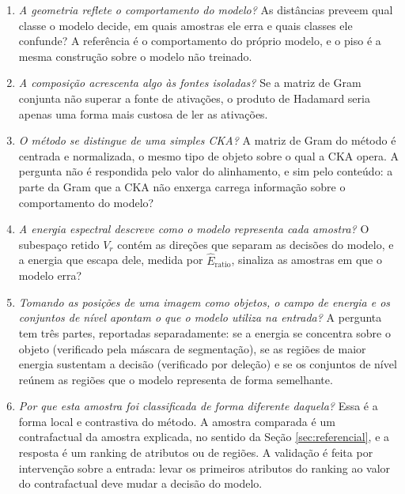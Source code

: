 \begin{enumerate}
    \item[\textbf{P1.}] \textit{A geometria reflete o comportamento do modelo?} As distâncias preveem qual classe o modelo decide, em quais amostras ele erra e quais classes ele confunde? A referência é o comportamento do próprio modelo, e o piso é a mesma construção sobre o modelo não treinado.

    \item[\textbf{P2.}] \textit{A composição acrescenta algo às fontes isoladas?} Se a matriz de Gram conjunta não superar a fonte de ativações, o produto de Hadamard seria apenas uma forma mais custosa de ler as ativações.

    \item[\textbf{P3.}] \textit{O método se distingue de uma simples CKA?} A matriz de Gram do método é centrada e normalizada, o mesmo tipo de objeto sobre o qual a CKA opera. A pergunta não é respondida pelo valor do alinhamento, e sim pelo conteúdo: a parte da Gram que a CKA não enxerga carrega informação sobre o comportamento do modelo?

    \item[\textbf{P4.}] \textit{A energia espectral descreve como o modelo representa cada amostra?} O subespaço retido $V_r$ contém as direções que separam as decisões do modelo, e a energia que escapa dele, medida por $\widehat{E}_{\mathrm{ratio}}$, sinaliza as amostras em que o modelo erra?

    \item[\textbf{P5.}] \textit{Tomando as posições de uma imagem como objetos, o campo de energia e os conjuntos de nível apontam o que o modelo utiliza na entrada?} A pergunta tem três partes, reportadas separadamente: se a energia se concentra sobre o objeto (verificado pela máscara de segmentação), se as regiões de maior energia sustentam a decisão (verificado por deleção) e se os conjuntos de nível reúnem as regiões que o modelo representa de forma semelhante.

    \item[\textbf{P6.}] \textit{Por que esta amostra foi classificada de forma diferente daquela?} Essa é a forma local e contrastiva do método. A amostra comparada é um contrafactual da amostra explicada, no sentido da Seção \ref{sec:referencial}, e a resposta é um ranking de atributos ou de regiões. A validação é feita por intervenção sobre a entrada: levar os primeiros atributos do ranking ao valor do contrafactual deve mudar a decisão do modelo.


\end{enumerate}
